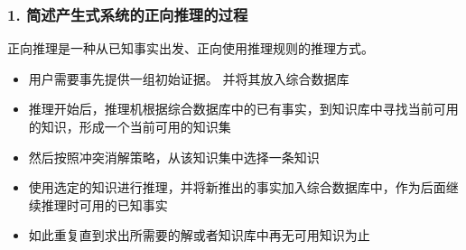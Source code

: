 \documentclass[a4paper]{article}   %
\begin{document}
 	\subsubsection*{1. \quad 简述产生式系统的正向推理的过程}
 	正向推理是一种从已知事实出发、正向使用推理规则的推理方式。 \par 
 	\begin{tcolorbox}
 		[colframe=blue!25,
   		colback=blue!10,
   		coltitle=blue!20!black,  
   		fonttitle=\bfseries,
   		adjusted title=Note:
   		]
   		\begin{itemize}
   			\item 用户需要事先提供一组初始证据。 并将其放入综合数据库
   			\item 推理开始后，推理机根据综合数据库中的已有事实，到知识库中寻找当前可用的知识，形成一个当前可用的知识集
   			\item 然后按照冲突消解策略，从该知识集中选择一条知识
   			\item 使用选定的知识进行推理，并将新推出的事实加入综合数据库中，作为后面继续推理时可用的已知事实
   			\item 如此重复直到求出所需要的解或者知识库中再无可用知识为止
   		\end{itemize}
 	\end{tcolorbox}
\end{document}
